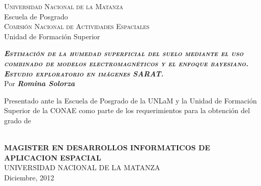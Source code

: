 %
%

\begin{titlepage}
\begin{center}

\begin{figure}[h]
\centering
\hspace{3cm}
\hspace{3cm}
 
 \end{figure} 

\normalsize \textsc{Universidad Nacional de la Matanza}\\
\vspace*{0.1cm}
\normalsize {Escuela de Posgrado}\\
\vspace*{0.5cm}
\centering
\normalsize \textsc{Comisión Nacional de Actividades Espaciales}\\
\vspace*{0.1cm}
\normalsize {Unidad de Formación Superior}\\
\vspace*{3cm}

\vspace*{0.3cm}
\bigskip
\large
\textsc{\textsl{\textbf{Estimación de la humedad superficial del suelo mediante el uso combinado de modelos electromagnéticos y el enfoque bayesiano.\\ Estudio exploratorio en imágenes SARAT.}}}\\
\vspace*{1cm}
\normalsize Por \textit{\textbf{Romina Solorza}}\\
\vspace*{3cm}
\begin{normalsize}Presentado ante la Escuela de Posgrado de la UNLaM y la Unidad de Formación Superior de la CONAE como parte de los requerimientos para la obtención del grado de\end{normalsize}\\
\vspace*{1cm}
\textbf{MAGISTER EN DESARROLLOS INFORMATICOS DE APLICACION ESPACIAL}\\
\vspace*{3.5cm}
UNIVERSIDAD NACIONAL DE LA MATANZA\\
\vspace*{0.1cm}
{Diciembre, 2012}\\


\end{center}
\end{titlepage}
